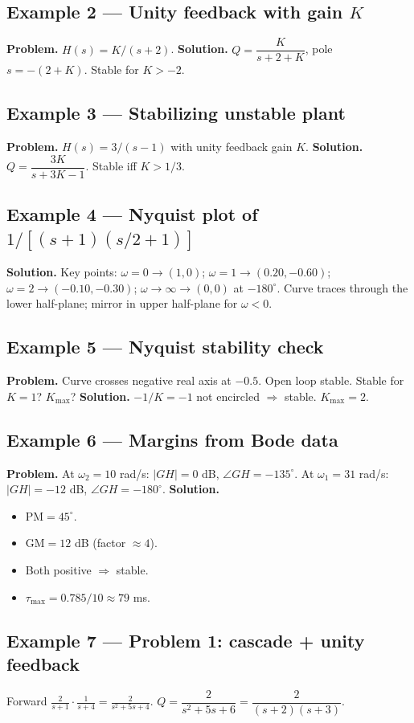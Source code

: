 \documentclass[11pt]{article}
\begin{document}
\subsection{Example 2 --- Unity feedback with gain $K$}
\textbf{Problem.} $H(s)=K/(s+2)$.
\textbf{Solution.} $Q=\dfrac{K}{s+2+K}$, pole $s=-(2+K)$. Stable for $K>-2$.

\subsection{Example 3 --- Stabilizing unstable plant}
\textbf{Problem.} $H(s)=3/(s-1)$ with unity feedback gain $K$.
\textbf{Solution.} $Q=\dfrac{3K}{s+3K-1}$. Stable iff $K>1/3$.

\subsection{Example 4 --- Nyquist plot of $1/[(s+1)(s/2+1)]$}
\textbf{Solution.} Key points: $\omega=0\to(1,0)$; $\omega=1\to(0.20,-0.60)$; $\omega=2\to(-0.10,-0.30)$; $\omega\to\infty\to(0,0)$ at $-180^\circ$. Curve traces through the lower half-plane; mirror in upper half-plane for $\omega<0$.

\subsection{Example 5 --- Nyquist stability check}
\textbf{Problem.} Curve crosses negative real axis at $-0.5$. Open loop stable. Stable for $K=1$? $K_\max$?
\textbf{Solution.} $-1/K=-1$ not encircled $\Rightarrow$ stable. $K_\max=2$.

\subsection{Example 6 --- Margins from Bode data}
\textbf{Problem.} At $\omega_2=10$ rad/s: $|GH|=0$ dB, $\angle GH=-135^\circ$. At $\omega_1=31$ rad/s: $|GH|=-12$ dB, $\angle GH=-180^\circ$.
\textbf{Solution.}
\begin{itemize}
\item $\mathrm{PM}=45^\circ$.
\item $\mathrm{GM}=12$ dB (factor $\approx 4$).
\item Both positive $\Rightarrow$ stable.
\item $\tau_\max=0.785/10\approx 79$ ms.
\end{itemize}

\subsection{Example 7 --- Problem 1: cascade + unity feedback}
Forward $\tfrac{2}{s+1}\cdot\tfrac{1}{s+4}=\tfrac{2}{s^2+5s+4}$. $Q=\dfrac{2}{s^2+5s+6}=\dfrac{2}{(s+2)(s+3)}$.
\end{document}
